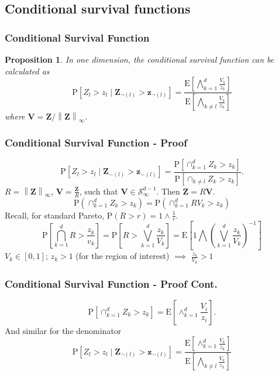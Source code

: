 \documentclass[aspectratio=169]{beamer}
\newcommand{\norm}[1]{\left\lVert #1 \right\rVert}
\newcommand{\pnorm}[2]{\norm{#1}_{#2}}
\newtheorem{prop}{Proposition}
\begin{document}
\subsection{Conditional survival functions}

\begin{frame}
  \frametitle{Conditional Survival Function}
  \begin{prop}
      In one dimension, the conditional survival function can be calculated as
   \begin{equation*}
      \label{eqn:condsurv1df}
      \text{P}\left[Z_l > z_l\mid \bm{Z}_{\neg(l)} > \bm{z}_{\neg(l)}\right] =
        \frac{\text{E}\left[\bigwedge_{k = 1}^d \frac{V_k}{z_k}\right]}{
                      \text{E}\left[\bigwedge_{k \neq l}\frac{V_k}{z_k}\right]}
    \end{equation*}
      where $\bm{V} = \bm{Z} / \pnorm{\bm{Z}}{\infty}$.
  \end{prop}
\end{frame}

\begin{frame}
  \frametitle{Conditional Survival Function - Proof}
  {\small
  \begin{equation*}
    \label{eqn:condsurv1d}
    \text{P}\left[Z_l > z_l\mid \bm{Z}_{-(l)} > \bm{z}_{-(l)}\right] =
      \frac{\text{P}\left[\cap_{k = 1}^d Z_k > z_k\right]}{\text{P}\left[\cap_{k \neq l} Z_k > z_k\right]}.
  \end{equation*}
  \pause
  $R = \pnorm{\bm{Z}}{\infty}$, $\bm{V} = \frac{\bm{Z}}{R}$, such that
    $\bm{V}\in \mathcal{S}_{\infty}^{d-1}$.  Then $\bm{Z} = R\bm{V}$.
  \begin{equation*}
    \text{P}\left(\cap_{k = 1}^d Z_k > z_k\right) = \text{P}\left(\cap_{k = 1}^d RV_k > z_k\right)
  \end{equation*}
  \pause
  Recall, for standard Pareto, $\text{P}(R > r) = 1\wedge\frac{1}{r}$.
  \begin{equation*}
    \text{P}\left[\bigcap_{k = 1}^d R > \frac{z_k}{v_k}\right] =
      \text{P}\left[R  > \bigvee_{k=1}^d\frac{z_k}{V_k}\right] =
      \text{E}\left[1 \bigwedge \left(\bigvee_{k = 1}^d\frac{z_k}{V_k}\right)^{-1}\right]
  \end{equation*}
  $V_k \in [0,1]$; $z_k > 1$ (for the region of interest) $\implies$ $\frac{z_k}{V_k} > 1$
  }
\end{frame}

\begin{frame}
    \frametitle{Conditional Survival Function - Proof Cont.}
    {\small 
  \begin{equation*}
    \text{P}\left[\cap_{k = 1}^d Z_k > z_k\right] = \text{E}\left[\wedge_{k = 1}^d\frac{V_i}{z_i}\right].
  \end{equation*}
  \pause
  And similar for the denominator
  \begin{equation*}
    \text{P}\left[Z_l > z_l\mid \bm{Z}_{\neg(l)} > \bm{z}_{\neg(l)}\right] =
      \frac{\text{E}\left[\wedge_{k = 1}^d \frac{V_k}{z_k}\right]}{\text{E}\left[
                \bigwedge_{k \neq l}\frac{V_k}{z_k}\right]}
  \end{equation*}
  }
\end{frame}
\end{document}
